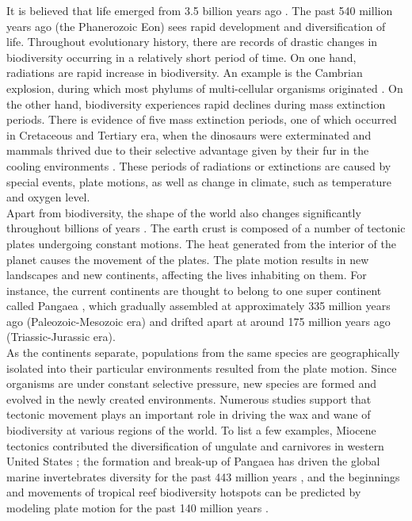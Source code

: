 \documentclass[11pt, a4paper,oneside,chapterprefix=false]{scrbook}
\begin{document}
It is believed that life emerged from 3.5 billion years ago \cite{algeo1998terrestrial}. The past 540 million years ago (the Phanerozoic Eon) sees rapid development and diversification of life. Throughout evolutionary history, there are records of drastic changes in biodiversity occurring in a relatively short period of time. On one hand, radiations are rapid increase in biodiversity. An example is the Cambrian explosion, during which most phylums of multi-cellular organisms originated \cite{alroy2001effects}. On the other hand, biodiversity experiences rapid declines during mass extinction periods. There is evidence of five mass extinction periods, one of which occurred in Cretaceous and Tertiary era, when the dinosaurs were exterminated and mammals thrived due to their selective advantage given by their fur in the cooling environments \cite{courtillot2002evolutionary}. These periods of radiations or extinctions are caused by special events, plate motions, as well as change in climate, such as temperature and oxygen level. \\

Apart from biodiversity, the shape of the world also changes significantly throughout billions of years \cite{wilson1963continental}. The earth crust is composed of a number of tectonic plates undergoing constant motions. The heat generated from the interior of the planet causes the movement of the plates. The plate motion results in new landscapes and new continents, affecting the lives inhabiting on them. For instance, the current continents are thought to belong to one super continent called Pangaea \cite{stampfli2013formation}, which gradually assembled at approximately 335 million years ago (Paleozoic-Mesozoic era) and drifted apart at around 175 million years ago (Triassic-Jurassic era). \\

As the continents separate, populations from the same species are geographically isolated into their particular environments resulted from the plate motion. Since organisms are under constant selective pressure, new species are formed and evolved in the newly created environments. Numerous studies support that tectonic movement plays an important role in driving the wax and wane of biodiversity at various regions of the world. To list a few examples, Miocene tectonics contributed the diversification of ungulate and carnivores in western United States \cite{kohn2008miocene}; the formation and break-up of Pangaea has driven the global marine invertebrates diversity for the past 443 million years \cite{zaffos2017plate}, and the beginnings and movements of tropical reef biodiversity hotspots can be predicted by modeling plate motion for the past 140 million years \cite{leprieur2016plate}. 
\end{document}

